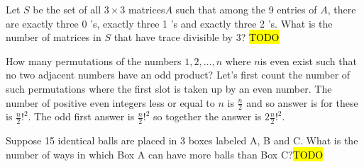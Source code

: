 \begin{example}
\label{exa:isi2020psa14}Let $S$ be the set of all $3\times3$ matrices$A$
such that among the 9 entries of $A$, there are exactly three 0 's,
exactly three 1 's and exactly three 2 's. What is the number of matrices
in $S$ that have trace divisible by 3? \hl{TODO}
\end{example}

\begin{example}
\label{exa:isi2023psb2}How many permutations of the numbers $1,2,\ldots,n$
where $n$is even exist such that no two adjacent numbers have an
odd product? Let's first count the number of such permutations where
the first slot is taken up by an even number. The number of positive
even integers less or equal to $n$ is $\frac{n}{2}$ and so answer
is for these is $\frac{n}{2}!^{2}$. The odd first answer is $\frac{n}{2}!^{2}$
so together the answer is $2\frac{n}{2}!^{2}$.
\end{example}

\begin{example}
\label{exa:isi2015psb4}Suppose 15 identical balls are placed in
3 boxes labeled A, B and C. What is the number of ways in which Box
A can have more balls than Box C?\hl{TODO}
\end{example}


